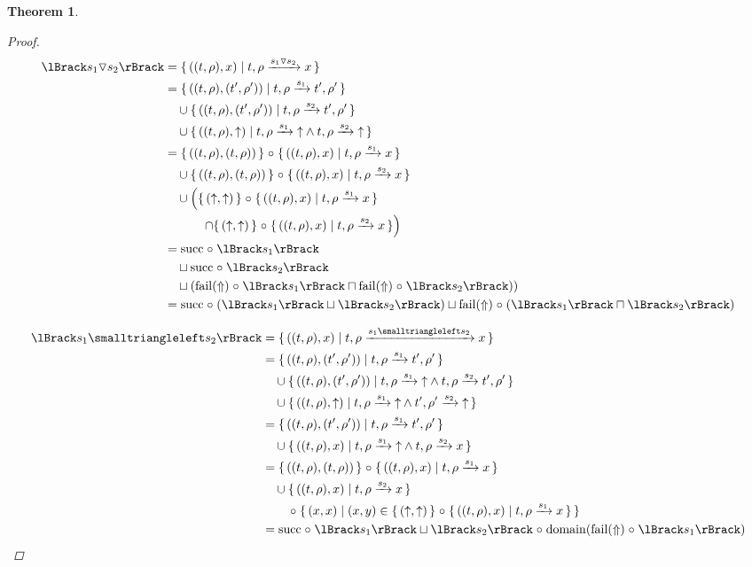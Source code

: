 \documentclass{article}
\newtheorem{theorem}{Theorem}
\newcommand{\fail}{\ensuremath \text{$\uparrow$}}
\newcommand{\choice}[2]{\ensuremath #1 \triangledown #2}
\newcommand{\leftchoice}[2]{\ensuremath #1 \smalltriangleleft #2}
\newcommand{\transform}[5]{#1, #2 \xrightarrow{#3} #4, #5}
\newcommand{\transformx}[4]{#1, #2 \xrightarrow{#3} #4}
\newcommand{\transformfail}[3]{#1, #2 \xrightarrow{#3} \fail}
\newcommand{\Fail}{\ensuremath \text{$\Uparrow$}}
\newcommand{\sem}[1]{\ensuremath \lBrack #1 \rBrack}
\newcommand{\setbuild}[2]{\ensuremath \{\, #1 \mid #2 \,\}}
\newcommand{\setbuildc}[1]{\ensuremath \{\, #1 \,\}}
\newcommand{\domain}{\ensuremath \operatorname{domain}}
\newcommand{\lfail}{\ensuremath \operatorname{fail}}
\newcommand{\lsucc}{\ensuremath \operatorname{succ}}
\newcommand{\comp}{\ensuremath \mathrel{\circ}}
\begin{document}
\begin{theorem}
\begin{proof}
\begin{align*}
  \sem{\choice{s_1}{s_2}}
     &= \setbuild{((t,\rho),x)}{\transformx{t}{\rho}{\choice{s_1}{s_2}}{x}} \\
     &= \setbuild{((t,\rho),(t',\rho'))}{\transform{t}{\rho}{s_1}{t'}{\rho'}} \\
     &\quad \cup {\setbuild{((t,\rho),(t',\rho'))}{\transform{t}{\rho}{s_2}{t'}{\rho'}}} \\
     &\quad \cup {\setbuild{((t,\rho),\fail)}{\transformfail{t}{\rho}{s_1} \land \transformfail{t}{\rho}{s_2}}} \\
     &= \setbuildc{((t,\rho),(t,\rho))} \comp {\setbuild{((t,\rho),x)}{\transformx{t}{\rho}{s_1}{x}}} \\
     &\quad \cup \setbuildc{((t,\rho),(t,\rho))} \comp {\setbuild{((t,\rho),x)}{\transformx{t}{\rho}{s_2}{x}}} \\
     &\quad \cup \left(\setbuildc{(\fail,\fail)} \comp {\setbuild{((t,\rho),x)}{\transformx{t}{\rho}{s_1}{x}}} \right. \\
     &\qquad\quad \left. \cap \setbuildc{(\fail,\fail)} \comp {\setbuild{((t,\rho),x)}{\transformx{t}{\rho}{s_2}{x}}} \right) \\
     &= \lsucc \comp \sem{s_1} \\
     &\quad \sqcup \lsucc \comp \sem{s_2} \\
     &\quad \sqcup \left(\lfail(\Fail) \comp \sem{s_1} \sqcap \lfail(\Fail) \comp \sem{s_2}) \right) \\
     &= \lsucc \comp (\sem{s_1} \sqcup \sem{s_2}) \sqcup \lfail(\Fail) \comp (\sem{s_1} \sqcap \sem{s_2})
\end{align*}

\begin{align*}
  \sem{\leftchoice{s_1}{s_2}}
     &= {\setbuild{((t,\rho),x)}{\transformx{t}{\rho}{\leftchoice{s_1}{s_2}}{x}}} \\
     &= {\setbuild{((t,\rho),(t',\rho'))}{\transform{t}{\rho}{s_1}{t'}{\rho'}}} \\
     &\quad \cup {\setbuild{((t,\rho),(t',\rho'))}{\transformfail{t}{\rho}{s_1} \land \transform{t}{\rho}{s_2}{t'}{\rho'}}} \\
     &\quad \cup {\setbuild{((t,\rho),\fail)}{\transformfail{t}{\rho}{s_1} \land \transformfail{t'}{\rho'}{s_2}}} \\
     &= {\setbuild{((t,\rho),(t',\rho'))}{\transform{t}{\rho}{s_1}{t'}{\rho'}}} \\
     &\quad \cup {\setbuild{((t,\rho),x)}{\transformfail{t}{\rho}{s_1} \land \transformx{t}{\rho}{s_2}{x}}} \\
     &= {\setbuildc{((t,\rho),(t,\rho))}} \comp {\setbuild{((t,\rho),x)}{\transformx{t}{\rho}{s_1}{x}}} \\
     & \quad \cup {\setbuild{((t,\rho),x)}{\transformx{t}{\rho}{s_2}{x}}} \\
     &\qquad \comp \setbuild{ (x,x) } { (x,y) \in \setbuildc{(\fail,\fail)} \comp \setbuild{((t,\rho),x)}{\transformx{t}{\rho}{s_1}{x}} } \\
     &= \lsucc \comp \sem{s_1} \sqcup \sem{s_2} \comp \domain (\lfail(\Fail) \comp \sem{s_1})
\end{align*}


\end{proof}
\end{theorem}
\end{document}

